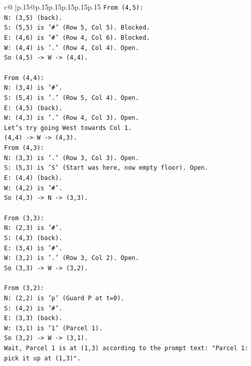 \documentclass{article}
\begin{document}
{\begin{supertabular}{c@{$\;$}|p{.15\linewidth}@{}p{.15\linewidth}p{.15\linewidth}p{.15\linewidth}p{.15\linewidth}p{.15\linewidth}}
{{{\texttt{From (4,5):} \\
\texttt{N: (3,5) (back).} \\
\texttt{S: (5,5) is '\#' (Row 5, Col 5). Blocked.} \\
\texttt{E: (4,6) is '\#' (Row 4, Col 6). Blocked.} \\
\texttt{W: (4,4) is '.' (Row 4, Col 4). Open.} \\
\texttt{So (4,5) {-}> W {-}> (4,4).} \\
\\ 
\texttt{From (4,4):} \\
\texttt{N: (3,4) is '\#'.} \\
\texttt{S: (5,4) is '.' (Row 5, Col 4). Open.} \\
\texttt{E: (4,5) (back).} \\
\texttt{W: (4,3) is '.' (Row 4, Col 3). Open.} \\
\texttt{Let's try going West towards Col 1.} \\
\texttt{(4,4) {-}> W {-}> (4,3).} \\
\texttt{From (4,3):} \\
\texttt{N: (3,3) is '.' (Row 3, Col 3). Open.} \\
\texttt{S: (5,3) is 'S' (Start was here, now empty floor). Open.} \\
\texttt{E: (4,4) (back).} \\
\texttt{W: (4,2) is '\#'.} \\
\texttt{So (4,3) {-}> N {-}> (3,3).} \\
\\ 
\texttt{From (3,3):} \\
\texttt{N: (2,3) is '\#'.} \\
\texttt{S: (4,3) (back).} \\
\texttt{E: (3,4) is '\#'.} \\
\texttt{W: (3,2) is '.' (Row 3, Col 2). Open.} \\
\texttt{So (3,3) {-}> W {-}> (3,2).} \\
\\ 
\texttt{From (3,2):} \\
\texttt{N: (2,2) is 'p' (Guard P at t=0).} \\
\texttt{S: (4,2) is '\#'.} \\
\texttt{E: (3,3) (back).} \\
\texttt{W: (3,1) is '1' (Parcel 1).} \\
\texttt{So (3,2) {-}> W {-}> (3,1).} \\
\texttt{Wait, Parcel 1 is at (1,3) according to the prompt text: "Parcel 1: pick it up at (1,3)".} \\
}}}
\end{supertabular}}
\end{document}
